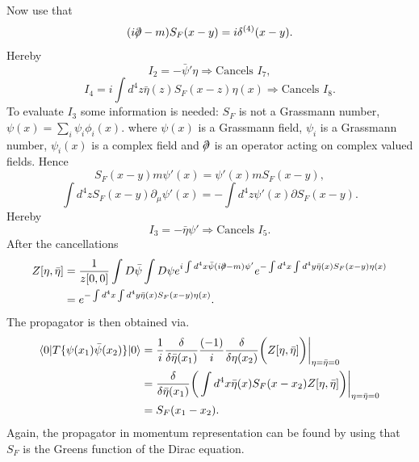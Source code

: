 Now use that
\begin{equation}
	(i\slashed \partial -m)S_F(x-y)=i\delta^{(4)}(x-y).
\end{equation} 	
Hereby
\begin{equation}
	I_2=-\bar{\psi}'\eta\Rightarrow \text{Cancels } I_7,
\end{equation} 	
\begin{equation}
	I_4=i\int d^4z\bar{\eta}(z)S_F(x-z)\eta(x)\Rightarrow \text{Cancels } I_8.
\end{equation} 
To evaluate $I_3$ some information is needed: $S_F$ is not a Grassmann number, $\psi(x)=\sum_i \psi_i\phi_i(x)$. where $\psi(x)$ is a Grassmann field, $\psi_i$ is a Grassmann number, $\psi_i(x)$ is a complex field and $\slashed \partial$ is an operator acting on complex valued fields. Hence
\begin{equation}
	S_F(x-y)m\psi'(x)=\psi'(x)mS_F(x-y),
\end{equation} 
\begin{equation}
	\int d^4z S_F(x-y)\partial_\mu\psi'(x)=-\int d^4z\psi'(x)\partial S_F(x-y).
\end{equation} 
Hereby
\begin{equation}
	I_3=-\bar{\eta}\psi'\Rightarrow \text{Cancels } I_5.
\end{equation} 
After the cancellations
\begin{equation}
	\begin{split}
		Z[\eta,\bar{\eta}]&=\frac{1}{z[0,0]}\int D\bar{\psi}\int D\psi e^{i\int d^4x \bar{\psi}(i\slashed \partial -m)\psi'}e^{-\int d^4x\int d^4y \bar{\eta}(x)S_F(x-y)\eta(x)}\\
		&=e^{-\int d^4x\int d^4y \bar{\eta}(x)S_F(x-y)\eta(x)}.\\
	\end{split}
\end{equation} 
The propagator is then obtained via.
\begin{equation}
	\begin{split}
		\braket{0|T\{\psi(x_1)\bar{\psi}(x_2)\}|0}&=\frac{1}{i}\frac{\delta}{\delta \bar{\eta}(x_1)}\frac{(-1)}{i}\frac{\delta}{\delta \eta(x_2)}\bigg(Z[\eta,\bar{\eta}]\bigg)\bigg|_{\eta=\bar{\eta}=0}\\
		&=\frac{\delta}{\delta \bar{\eta}(x_1)}\bigg(\int d^4x \bar{\eta}(x)S_F(x-x_2)Z[\eta,\bar{\eta}]\bigg)\bigg|_{\eta=\bar{\eta}=0}\\
		&=S_F(x_1-x_2).
	\end{split}
\end{equation}  
Again, the propagator in momentum representation can be found by using that $S_F$ is the Greens function of the Dirac equation. 

